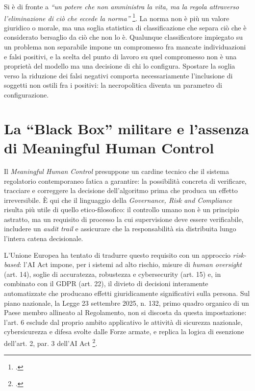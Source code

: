 \ifstampa\documentclass[a4paper,12pt,twoside,openright]{report}\else\documentclass[a4paper,12pt]{report}\fi
\begin{document}
Si è di fronte a \textit{``un potere che non amministra la vita, ma la regola
attraverso l'eliminazione di ciò che eccede la norma''} \footcite{buffa_2025}. La
norma non è più un valore giuridico o morale, ma una soglia statistica di
classificazione che separa ciò che è considerato bersaglio da ciò che non lo è.
Qualunque classificatore impiegato su un problema non separabile impone un
compromesso fra mancate individuazioni e falsi positivi, e la scelta del punto
di lavoro su quel compromesso non è una proprietà del modello ma una decisione di
chi lo configura. Spostare la soglia verso la riduzione dei falsi negativi
comporta necessariamente l'inclusione di soggetti non ostili fra i positivi: la
necropolitica diventa un parametro di configurazione.

\section{La ``Black Box'' militare e l'assenza di Meaningful Human Control}

Il \textit{Meaningful Human Control} presuppone un cardine tecnico che il sistema
regolatorio contemporaneo fatica a garantire: la possibilità concreta di
verificare, tracciare e correggere la decisione dell'algoritmo prima che produca
un effetto irreversibile. È qui che il linguaggio della \textit{Governance, Risk
and Compliance} risulta più utile di quello etico-filosofico: il controllo umano
non è un principio astratto, ma un requisito di processo la cui supervisione deve
essere verificabile, includere un \textit{audit trail} e assicurare che la
responsabilità sia distribuita lungo l'intera catena decisionale.

L'Unione Europea ha tentato di tradurre questo requisito con un approccio
\textit{risk-based}: l'AI Act impone, per i sistemi ad alto rischio, misure di
\textit{human oversight} (art. 14), soglie di accuratezza, robustezza e
cybersecurity (art. 15) e, in combinato con il GDPR (art. 22), il divieto di
decisioni interamente automatizzate che producano effetti giuridicamente
significativi sulla persona. Sul piano nazionale, la Legge 23 settembre 2025, n.
132, primo quadro organico di un Paese membro allineato al Regolamento, non si
discosta da questa impostazione: l'art. 6 esclude dal proprio ambito applicativo
le attività di sicurezza nazionale, cybersicurezza e difesa svolte dalle Forze
armate, e replica la logica di esenzione dell'art. 2, par. 3 dell'AI Act
\footcite{legge_132_2025}.
\end{document}
